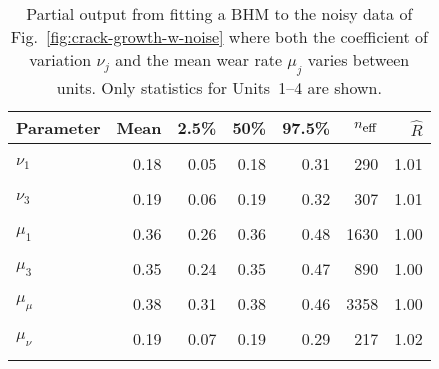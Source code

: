 \begin{table}
\centering
\caption{\label{tab:pp_both}Partial output from fitting a BHM to the noisy data of Fig.~\ref{fig:crack-growth-w-noise} where both the coefficient of variation $\nu_j$ and the mean wear rate $\mu_j$ varies between units. Only statistics for Units~1--4 are shown.}
\centering
\begin{tabular}[t]{lrrrrrr}
\toprule
Parameter & Mean & 2.5\% & 50\% & 97.5\% & $n_{\small{\mbox{eff}}}$ & $\hat{R}$\\
\midrule
\cellcolor{gray!10}{$\sigma$} & \cellcolor{gray!10}{0.03} & \cellcolor{gray!10}{0.02} & \cellcolor{gray!10}{0.03} & \cellcolor{gray!10}{0.04} & \cellcolor{gray!10}{551} & \cellcolor{gray!10}{1.01}\\
$\nu_1$ & 0.18 & 0.05 & 0.18 & 0.31 & 290 & 1.01\\
\cellcolor{gray!10}{$\nu_2$} & \cellcolor{gray!10}{0.19} & \cellcolor{gray!10}{0.07} & \cellcolor{gray!10}{0.19} & \cellcolor{gray!10}{0.32} & \cellcolor{gray!10}{293} & \cellcolor{gray!10}{1.02}\\
$\nu_3$ & 0.19 & 0.06 & 0.19 & 0.32 & 307 & 1.01\\
\cellcolor{gray!10}{$\nu_4$} & \cellcolor{gray!10}{0.19} & \cellcolor{gray!10}{0.05} & \cellcolor{gray!10}{0.19} & \cellcolor{gray!10}{0.33} & \cellcolor{gray!10}{233} & \cellcolor{gray!10}{1.02}\\
\addlinespace
$\mu_1$ & 0.36 & 0.26 & 0.36 & 0.48 & 1630 & 1.00\\
\cellcolor{gray!10}{$\mu_2$} & \cellcolor{gray!10}{0.43} & \cellcolor{gray!10}{0.32} & \cellcolor{gray!10}{0.42} & \cellcolor{gray!10}{0.57} & \cellcolor{gray!10}{791} & \cellcolor{gray!10}{1.01}\\
$\mu_3$ & 0.35 & 0.24 & 0.35 & 0.47 & 890 & 1.00\\
\cellcolor{gray!10}{$\mu_4$} & \cellcolor{gray!10}{0.34} & \cellcolor{gray!10}{0.23} & \cellcolor{gray!10}{0.34} & \cellcolor{gray!10}{0.46} & \cellcolor{gray!10}{631} & \cellcolor{gray!10}{1.01}\\
$\mu_\mu$ & 0.38 & 0.31 & 0.38 & 0.46 & 3358 & 1.00\\
\addlinespace
\cellcolor{gray!10}{$\sigma_\mu$} & \cellcolor{gray!10}{0.07} & \cellcolor{gray!10}{0.01} & \cellcolor{gray!10}{0.07} & \cellcolor{gray!10}{0.17} & \cellcolor{gray!10}{251} & \cellcolor{gray!10}{1.02}\\
$\mu_\nu$ & 0.19 & 0.07 & 0.19 & 0.29 & 217 & 1.02\\
\cellcolor{gray!10}{$\sigma_\nu$} & \cellcolor{gray!10}{0.04} & \cellcolor{gray!10}{0.00} & \cellcolor{gray!10}{0.03} & \cellcolor{gray!10}{0.11} & \cellcolor{gray!10}{270} & \cellcolor{gray!10}{1.02}\\
\bottomrule
\end{tabular}
\end{table}
